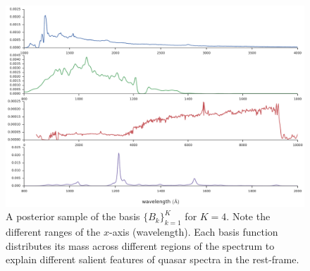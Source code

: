 \documentclass{article}
\begin{document}
\begin{figure}[t]
\vskip 0.2in
\begin{center}
\centerline{\includegraphics[width=2\columnwidth]{../figs/basis_samp_K_4}}
\vskip -0.2in
\caption{A posterior sample of the basis $\{ B_k \}_{k=1}^K$ for $K=4$.  Note the different ranges of the $x$-axis (wavelength).  Each basis function distributes its mass across different regions of the spectrum to explain different salient features of quasar spectra in the rest-frame. }
\label{fig:basis}
\end{center}
\end{figure}
\end{document}
